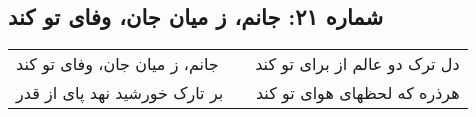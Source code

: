 \begin{center}
\section*{شماره ۲۱: جانم، ز میان جان، وفای تو کند}
\label{sec:021}
\begin{longtable}{l p{0.5cm} r}
جانم، ز میان جان، وفای تو کند
&&
دل ترک دو عالم از برای تو کند
\\
بر تارک خورشید نهد پای از قدر
&&
هرذره که لحظهای هوای تو کند
\\
\end{longtable}
\end{center}
